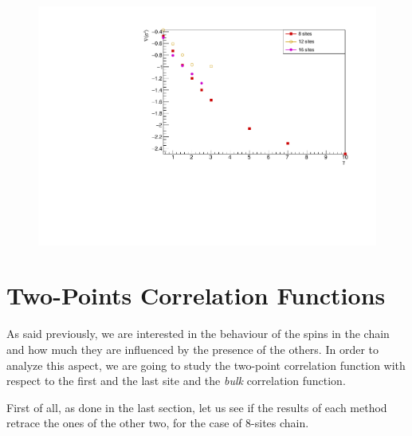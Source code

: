 \begin{figure}[H]
    \centering
    \includegraphics[scale=0.7]{Figures/gradLMvsGammavsSize_firstQuarterChain.pdf}
    \caption{}
    \label{fig:my_label}
\end{figure}

\section{Two-Points Correlation Functions}
As said previously, we are interested in the behaviour of the spins in the chain and how much they are influenced by the presence of the others. In order to analyze this aspect, we are going to study the two-point correlation function with respect to the first and the last site and the \emph{bulk} correlation function.

First of all, as done in the last section, let us see if the results of each method retrace the ones of the other two, for the case of 8-sites chain. 

